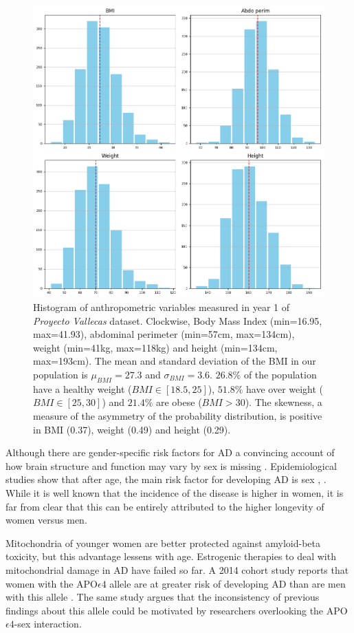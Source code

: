 \documentclass[11pt]{article}
\theoremstyle{definition}
\theoremstyle{remark}
\begin{document}
\begin{figure}[H]
        \centering
        \includegraphics[keepaspectratio, width=.8\linewidth]{figures/Fig_anthro}
        \caption{Histogram of anthropometric variables measured in year 1 of \emph{Proyecto Vallecas} dataset. Clockwise, Body Mass Index (min=16.95, max=41.93), abdominal perimeter (min=57cm, max=134cm), weight (min=41kg, max=118kg) and height (min=134cm, max=193cm). 
        The mean and standard deviation of the BMI in our population is $\mu_{BMI}=27.3$ and $\sigma_{BMI}=3.6$. $26.8\%$ of the population have a healthy weight ($BMI \in [18.5, 25]$), $51.8\%$ have over weight ($BMI \in [25,30]$) and $21.4\%$ are obese ($BMI > 30$). 
        The skewness, a measure of the asymmetry of the probability distribution, is positive in BMI (0.37), weight (0.49) and height (0.29).} 
        \label{fig:anthro}
\end{figure}

Although there are gender-specific risk factors for AD a convincing account of how brain structure and function  may vary by sex is missing \cite{mielke2014clinical}. Epidemiological studies show that after age, the main risk factor for developing AD  is sex \cite{vina2010women}, \cite{mazure2016sex}. While it is well known that the incidence of the disease is higher in women, it is far from clear that this can be entirely attributed to the higher longevity of women versus men. 

Mitochondria of younger women are better protected against amyloid-beta toxicity, but this advantage lessens with age. Estrogenic therapies to deal with mitochondrial damage in AD have failed so far. A 2014 cohort study reports that women with the APO$\epsilon4$ allele are at greater risk of developing AD than are men with this allele \cite{altmann2014sex}. The same study argues that the inconsistency of previous findings about this allele could be motivated by researchers overlooking the APO$\epsilon4$-sex interaction.
\end{document}
